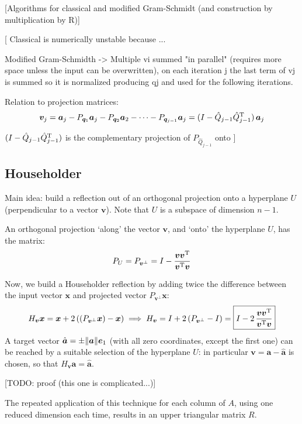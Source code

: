 \documentclass[
  12pt,
  paper=a4,
]{scrartcl} %
\begin{document}
[Algorithms for classical and modified Gram-Schmidt (and construction by multiplication by R)]

[
Classical is numerically unstable because ...

Modified Gram-Schmidth -> Multiple vi summed "in parallel" (requires more space unless the input can be overwritten), on each iteration j the last term of vj is summed so it is normalized producing qj and used for the following iterations.

Relation to projection matrices:
\[
\bm v_j =
    \bm a_j - P_{\bm q_1} \bm a_j 
    - P_{\bm q_2} \bm a_2 -
    \cdots - P_{\bm q_{j-1}} \bm a_j
    =
    (I - \hat{Q}_{j-1} \hat{Q}_{j-1}^{\mathrm{T}})\,\bm a_j
\]

$(I - \hat{Q}_{j-1} \hat{Q}_{j-1}^{\mathrm{T}})$ is the complementary projection of $P_{\hat{Q}_{j-1}}$ onto 
]

\subsection*{Householder}

Main idea: build a reflection out of an orthogonal projection onto a hyperplane $U$ (perpendicular to a vector $\bm v$). Note that $U$ is a subspace of dimension  $n-1$.
    
An orthogonal projection `along' the vector $\bm v$, and `onto' the hyperplane $U$, has the matrix: \[ P_U = P_{\bm v^\perp} = I - \frac{\bm v\bm v^{\mathrm{T}}}{\bm v^{\mathrm{T}}\bm v} \]
    
    Now, we build a Householder reflection by adding twice the difference between the input vector $\bm x$ and projected vector $P_{\bm v^\perp}\bm x$:
    \[
        H_{\bm v}\bm x = \bm x + 2\, ( (P_{\bm v^\perp}\bm x) - \bm x)
        \implies
        H_{\bm v}
        =
        I + 2\, (P_{\bm v^\perp} - I)
        =
        \boxed{
            I - 2\, \frac{\bm v\bm v^{\mathrm{T}}}{\bm v^{\mathrm{T}}\bm v}
        }
    \]
A target vector $\hat{\bm a} =\pm\|\bm a\|\bm e_1$ (with all zero coordinates, except the first one) can be reached by a suitable selection of the hyperplane $U$: in particular $\bm v=\bm a - \hat{\bm a}$ is chosen, so that $H_{\bm v} \bm a = \hat{\bm a}$.

[TODO: proof (this one is complicated...)]
    
The repeated application of this technique for each column of $A$, using one reduced dimension each time, results in an upper triangular matrix $R$.
\end{document}
